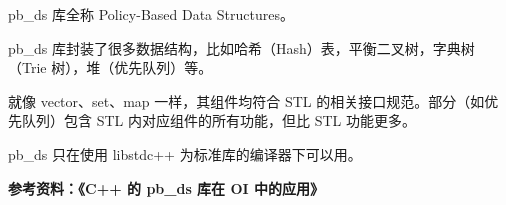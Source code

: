 
pb\_ds 库全称 Policy-Based Data Structures。

pb\_ds 库封装了很多数据结构，比如哈希（Hash）表，平衡二叉树，字典树（Trie 树），堆（优先队列）等。

就像 vector、set、map 一样，其组件均符合 STL 的相关接口规范。部分（如优先队列）包含 STL 内对应组件的所有功能，但比 STL 功能更多。

pb\_ds 只在使用 libstdc++ 为标准库的编译器下可以用。

\textbf{参考资料：《C++ 的 pb\_ds 库在 OI 中的应用》}
